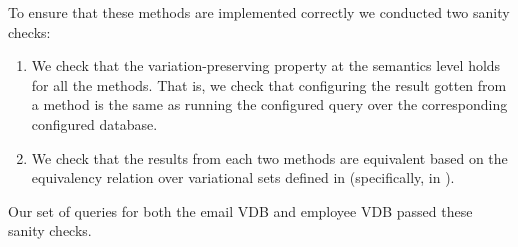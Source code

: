 To ensure that these methods are implemented correctly we conducted two
sanity checks:
\begin{enumerate}
\item We check that the variation-preserving property at the semantics level
holds for all the methods. That is, we check that configuring the result gotten from
a method is the same as running the configured query over the corresponding 
configured database.
%
\item We check that the results from each two methods are equivalent based on
the equivalency relation over variational sets defined in  
(specifically, in ).
\end{enumerate}

Our set of queries for both the email VDB and employee VDB passed these sanity checks.
